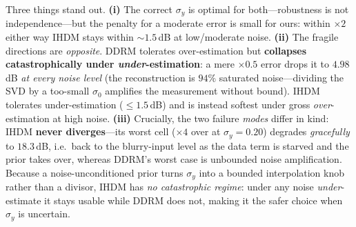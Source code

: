 \documentclass[11pt]{article}
\begin{document}
Three things stand out. \textbf{(i)} The correct $\sigma_y$ is optimal for both---robustness is not
independence---but the penalty for a moderate error is small for ours: within $\times2$ either way IHDM
stays within $\sim\!1.5$\,dB at low/moderate noise. \textbf{(ii)} The fragile directions are
\emph{opposite}. DDRM tolerates over-estimation but \textbf{collapses catastrophically under
\emph{under}-estimation}: a mere $\times0.5$ error drops it to $4.98$\,dB \emph{at every noise level}
(the reconstruction is $94\%$ saturated noise---dividing the SVD by a too-small $\sigma_0$ amplifies
the measurement without bound). IHDM tolerates under-estimation ($\le\!1.5$\,dB) and is instead
softest under gross \emph{over}-estimation at high noise. \textbf{(iii)} Crucially, the two failure
\emph{modes} differ in kind: IHDM \textbf{never diverges}---its worst cell ($\times4$ over at
$\sigma_y{=}0.20$) degrades \emph{gracefully} to $18.3$\,dB, i.e.\ back to the blurry-input level as
the data term is starved and the prior takes over, whereas DDRM's worst case is unbounded noise
amplification. Because a noise-unconditioned prior turns $\sigma_y$ into a bounded interpolation
knob rather than a divisor, IHDM has \emph{no catastrophic regime}: under any noise
\emph{under}-estimate it stays usable while DDRM does not, making it the safer choice when $\sigma_y$
is uncertain.
\end{document}
